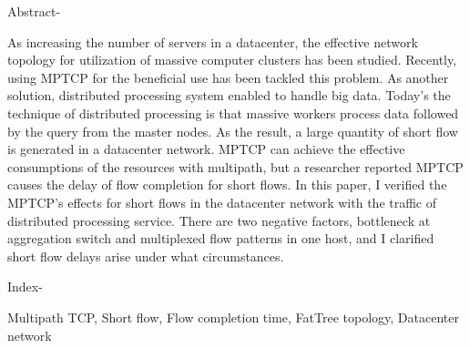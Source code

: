 \documentclass[10pt, a4paper, twocolumn]{jsarticle}
\begin{document}
\begin{spacing}{0.7}
\begin{bfseries}
\begin{itshape}
Abstract-
\end{itshape}

As increasing the number of servers in a datacenter, the effective network
topology for utilization of massive computer clusters has been studied.
Recently, using MPTCP for the beneficial use has been tackled this problem.
As another solution, distributed processing system enabled to handle big data.
Today's the technique of distributed processing is that massive workers
process data followed by the query from the master nodes.
As the result, a large quantity of short flow is generated in a datacenter
network.
MPTCP can achieve the effective consumptions of the resources with multipath,
but a researcher reported MPTCP causes the delay of flow completion for short
flows.
In this paper, I verified the MPTCP's effects for short flows in the datacenter
network with the traffic of distributed processing service.
There are two negative factors, bottleneck at aggregation switch and multiplexed
flow patterns in one host, and I clarified short flow delays arise under what
circumstances.


\vspace{0.5cm}
\begin{itshape}
Index-
\end{itshape}
Multipath TCP, Short flow, Flow completion time, FatTree topology, Datacenter
network\end{bfseries}
\end{spacing}
\vspace{0.5cm}
\end{document}
